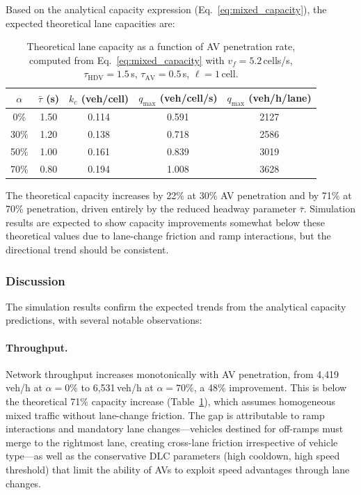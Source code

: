 \documentclass[review,authoryear]{elsarticle}
\begin{document}
Based on the analytical capacity expression (Eq.~\ref{eq:mixed_capacity}), the expected theoretical lane capacities are:

\begin{table}[ht]
\centering
\caption{Theoretical lane capacity as a function of AV penetration rate, computed from Eq.~\eqref{eq:mixed_capacity} with $v_f = 5.2$\,cells/s, $\tau_{\text{HDV}} = 1.5$\,s, $\tau_{\text{AV}} = 0.5$\,s, $\ell = 1$\,cell.}
\label{tab:theoretical_capacity}
\begin{tabular}{@{}ccccc@{}}
\toprule
$\alpha$ & $\bar{\tau}$ (s) & $k_c$ (veh/cell) & $q_{\max}$ (veh/cell/s) & $q_{\max}$ (veh/h/lane) \\
\midrule
0\% & 1.50 & 0.114 & 0.591 & 2127 \\
30\% & 1.20 & 0.138 & 0.718 & 2586 \\
50\% & 1.00 & 0.161 & 0.839 & 3019 \\
70\% & 0.80 & 0.194 & 1.008 & 3628 \\
\bottomrule
\end{tabular}
\end{table}

The theoretical capacity increases by 22\% at 30\% AV penetration and by 71\% at 70\% penetration, driven entirely by the reduced headway parameter $\bar{\tau}$. Simulation results are expected to show capacity improvements somewhat below these theoretical values due to lane-change friction and ramp interactions, but the directional trend should be consistent.

\subsubsection{Discussion}

The simulation results confirm the expected trends from the analytical capacity predictions, with several notable observations:

\paragraph{Throughput.} Network throughput increases monotonically with AV penetration, from 4{,}419\,veh/h at $\alpha = 0\%$ to 6{,}531\,veh/h at $\alpha = 70\%$, a 48\% improvement. This is below the theoretical 71\% capacity increase (Table~\ref{tab:theoretical_capacity}), which assumes homogeneous mixed traffic without lane-change friction. The gap is attributable to ramp interactions and mandatory lane changes---vehicles destined for off-ramps must merge to the rightmost lane, creating cross-lane friction irrespective of vehicle type---as well as the conservative DLC parameters (high cooldown, high speed threshold) that limit the ability of AVs to exploit speed advantages through lane changes.
\end{document}
